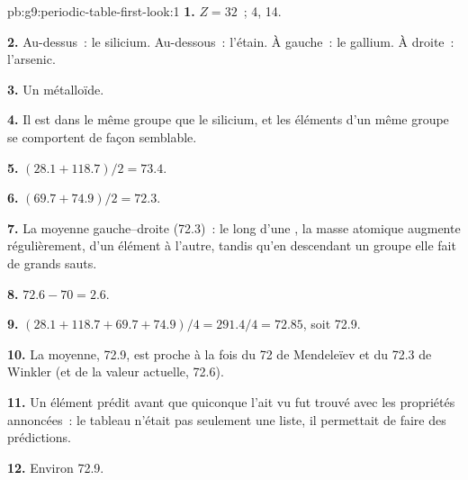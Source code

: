 \begin{solution}{pb:g9:periodic-table-first-look:1}
\textbf{1.} $Z = 32$~;  4,  14.

\textbf{2.} Au-dessus~: le silicium. Au-dessous~: l'étain. À gauche~: le
gallium. À droite~: l'arsenic.

\textbf{3.} Un métalloïde.

\textbf{4.} Il est dans le même groupe que le silicium, et les éléments
d'un même groupe se comportent de façon semblable.

\textbf{5.} $(28.1 + 118.7)/2 = 73.4$.

\textbf{6.} $(69.7 + 74.9)/2 = 72.3$.

\textbf{7.} La moyenne gauche--droite (72.3)~: le long d'une , la
masse atomique augmente régulièrement, d'un élément à l'autre, tandis
qu'en descendant un groupe elle fait de grands sauts.

\textbf{8.} $72.6 - 70 = 2.6$.

\textbf{9.} $(28.1 + 118.7 + 69.7 + 74.9)/4 = 291.4/4 = 72.85$, soit
72.9.

\textbf{10.} La moyenne, 72.9, est proche à la fois du 72 de Mendeleïev
et du 72.3 de Winkler (et de la valeur actuelle, 72.6).

\textbf{11.} Un élément prédit avant que quiconque l'ait vu fut trouvé
avec les propriétés annoncées~: le tableau n'était pas seulement une
liste, il permettait de faire des prédictions.

\textbf{12.} Environ 72.9.
\end{solution}
